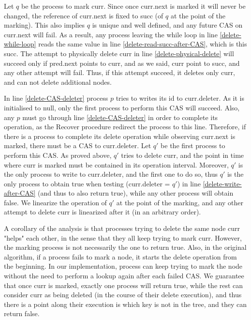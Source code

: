 Let $q$ be the process to mark curr. Since once curr.next is marked it will never be changed, the reference of curr.next is fixed to succ (of $q$ at the point of the marking). This also implies $q$ is unique and well defined, and any future CAS on curr.next will fail. As a result, any process leaving the while loop in line \ref{delete-while-loop} reads the same value in line \ref{delete-read-succ-after-CAS}, which is this succ. The attempt to physically delete curr in line \ref{delete-physical-delete} will succeed only if pred.next points to curr, and as we said, curr point to succ, and any other attempt will fail. Thus, if this attempt succeed, it deletes only curr, and can not delete additional nodes.

In line \ref{delete-CAS-deleter} process $p$ tries to writes its id to curr.deleter. As it is initialised to null, only the first process to perform this CAS will succeed. Also, any $p$ must go through line \ref{delete-CAS-deleter} in order to complete its operation, as the Recover procedure redirect the process to this line. Therefore, if there is a process to complete its delete operation while observing curr.next is marked, there must be a CAS to curr.deleter. Let $q'$ be the first process to perform this CAS. As proved above, $q'$ tries to delete curr, and the point in time where curr is marked must be contained in its operation interval. Moreover, $q'$ is the only process to write to curr.deleter, and the first one to do so, thus $q'$ is the only process to obtain true when testing (curr.deleter = $q'$) in line \ref{delete-write-after-CAS} (and thus to also return true), while any other process will obtain false. We linearize the operation of $q'$ at the point of the marking, and any other attempt to delete curr is linearized after it (in an arbitrary order).

A corollary of the analysis is that processes trying to delete the same node curr "helps" each other, in the sense that they all keep trying to mark curr. However, the marking process is not necessarily the one to return true. Also, in the original algorithm, if a process fails to mark a node, it starts the delete operation from the beginning. In our implementation, process can keep trying to mark the node without the need to perform a lookup again after each failed CAS. We guarantee that once curr is marked, exactly one process will return true, while the rest can consider curr as being deleted (in the course of their delete execution), and thus there is a point along their execution is which key is not in the tree, and they can return false.








 